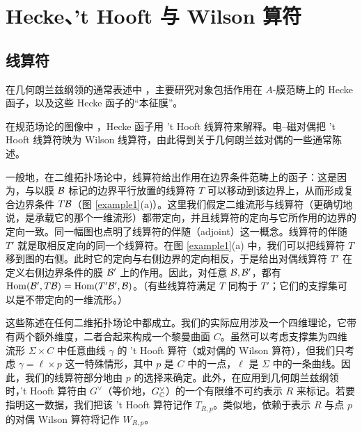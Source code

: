 
\section{Hecke、't Hooft 与 Wilson 算符}\label{wtw}

\subsection{线算符}

在几何朗兰兹纲领的通常表述中 \cite{BD}，主要研究对象包括作用在 $A$-膜范畴上的 Hecke 函子，以及这些 Hecke 函子的“本征膜”。

在规范场论的图像中 \cite{KW}，Hecke 函子用 't Hooft 线算符来解释。电–磁对偶把 't Hooft 线算符映为 Wilson 线算符，由此得到关于几何朗兰兹对偶的一些通常陈述。

一般地，在二维拓扑场论中，线算符给出作用在边界条件范畴上的函子：这是因为，与以膜 ${\mathcal B}$ 标记的边界平行放置的线算符 $T$ 可以移动到该边界上，从而形成复合边界条件 $T{\mathcal B}$（图 \ref{example1}(a)）。这里我们假定二维流形与线算符（更确切地说，是承载它的那个一维流形）都带定向，并且线算符的定向与它所作用的边界的定向一致。同一幅图也点明了线算符的伴随（adjoint）这一概念。线算符的伴随 $T'$ 就是取相反定向的同一个线算符。在图 \ref{example1}(a) 中，我们可以把线算符 $T$ 移到图的右侧。此时它的定向与右侧边界的定向相反，于是给出对偶线算符 $T'$ 在定义右侧边界条件的膜 ${\mathcal B}'$ 上的作用。因此，对任意 ${\mathcal B},{\mathcal B}'$，都有 ${\mathrm{Hom}}({\mathcal B}',T{\mathcal B})={\mathrm{Hom}}(T'{\mathcal B}',{\mathcal B})$。（有些线算符满足 $T$ 同构于 $T'$；它们的支撑集可以是不带定向的一维流形。）

这些陈述在任何二维拓扑场论中都成立。我们的实际应用涉及一个四维理论，它带有两个额外维度，二者合起来构成一个黎曼曲面 $C$。虽然可以考虑支撑集为四维流形 $\Sigma\times C$ 中任意曲线 $\gamma$ 的 't Hooft 算符（或对偶的 Wilson 算符），但我们只考虑 $\gamma=\ell\times p$ 这一特殊情形，其中 $p$ 是 $C$ 中的一点，$\ell$ 是 $\Sigma$ 中的一条曲线。因此，我们的线算符部分地由 $p$ 的选择来确定。此外，在应用到几何朗兰兹纲领时，'t Hooft 算符由 $G^\vee$（等价地，$G^\vee_{\mathbb C}$）的一个有限维不可约表示 $R$ 来标记。若要指明这一数据，我们把该 't Hooft 算符记作 $T_{R,p}$。类似地，依赖于表示 $R$ 与点 $p$ 的对偶 Wilson 算符将记作 $W_{R,p}$。


